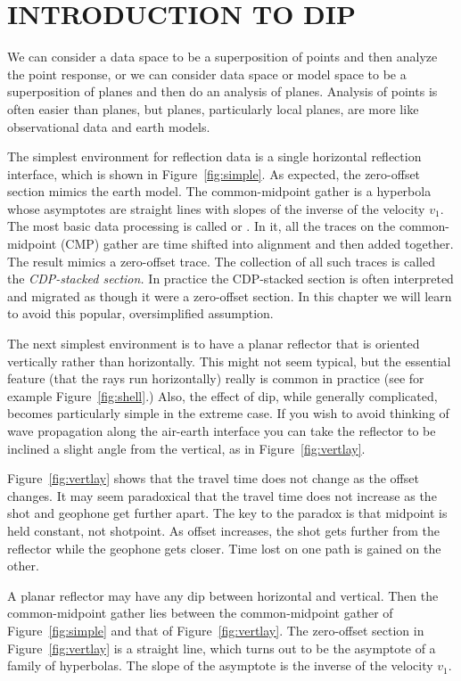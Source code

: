 \section{INTRODUCTION TO DIP}
We can consider a data space to be a superposition of points
and then analyze the point response,
or we can consider data space
or model space to be a superposition of planes
and then do an analysis of planes.
Analysis of points is often easier than planes,
but planes, particularly local planes,
are more like observational data and earth models.
\par
The simplest environment for reflection data
is a single horizontal reflection interface,
which is shown in Figure~\ref{fig:simple}.
As expected, the zero-offset section mimics the earth model.
The common-midpoint gather is a hyperbola
whose asymptotes are straight lines
with slopes of the inverse of the velocity  $v_1$.
The most basic data processing is called
{\em 
{}
}
or .
In it, all the traces on the common-midpoint (CMP) gather
are time shifted into alignment
and then added together.
The result mimics a zero-offset trace.
The collection of all such traces is called the
{\em 
CDP-stacked section.
}
In practice the CDP-stacked section is often interpreted and migrated
as though it were a zero-offset section.
In this chapter we will learn to avoid this popular,
oversimplified assumption.
\par
The next simplest environment is to have a planar reflector
that is oriented vertically rather than horizontally.
This might not seem typical,
but the essential feature (that the rays run horizontally)
really is common in practice
(see for example Figure~\ref{fig:shell}.)
Also, the effect of dip, while generally complicated,
becomes particularly simple in the extreme case.
If you wish to avoid thinking of 
wave propagation along the air-earth interface
you can take the reflector to be inclined a slight angle from the vertical,
as in Figure~\ref{fig:vertlay}.
\par
Figure~\ref{fig:vertlay} shows that the travel time
does not change as the offset changes.
It may seem paradoxical that the travel time does not increase as
the shot and geophone get further apart.
The key to the paradox is that midpoint is held constant, not shotpoint.
As offset increases,
the shot gets further from the reflector
while the geophone gets closer.
Time lost on one path is gained on the other.
\par
A planar reflector may have any dip between horizontal and vertical.
Then the common-midpoint gather lies between
the common-midpoint gather of Figure~\ref{fig:simple}
and that of Figure~\ref{fig:vertlay}.
The zero-offset section in Figure~\ref{fig:vertlay} is a straight line,
which turns out to be the asymptote of a family of hyperbolas.
The slope of the asymptote is the inverse of the velocity  $v_1$.

